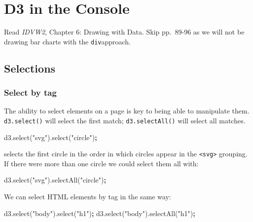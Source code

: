 \documentclass[openany]{book}
\newenvironment{Shaded}{\begin{snugshade}}{\end{snugshade}}
\newcommand{\AttributeTok}[1]{\textcolor[rgb]{0.77,0.63,0.00}{#1}}
\newcommand{\NormalTok}[1]{#1}
\newcommand{\OperatorTok}[1]{\textcolor[rgb]{0.81,0.36,0.00}{\textbf{#1}}}
\newcommand{\StringTok}[1]{\textcolor[rgb]{0.31,0.60,0.02}{#1}}
\newcommand{\VariableTok}[1]{\textcolor[rgb]{0.00,0.00,0.00}{#1}}
\begin{document}
\protect\hyperlink{web-tech-shapes}{}

\hypertarget{d3console}{%
\chapter{D3 in the Console }\label{d3console}}

Read \emph{IDVW2}, Chapter 6: Drawing with Data. Skip pp.~89-96 as we will not be drawing bar charts with the \texttt{div}approach.

\hypertarget{selections}{%
\section{Selections }\label{selections}}

\hypertarget{select-by-tag}{%
\subsection{Select by tag}\label{select-by-tag}}

The ability to select elements on a page is key to being able to manipulate them. \texttt{d3.select()} will select the first match; \texttt{d3.selectAll()} will select all matches.

\begin{Shaded}
\begin{Highlighting}[]
\VariableTok{d3}\NormalTok{.}\AttributeTok{select}\NormalTok{(}\StringTok{"svg"}\NormalTok{).}\AttributeTok{select}\NormalTok{(}\StringTok{"circle"}\NormalTok{)}\OperatorTok{;}
\end{Highlighting}
\end{Shaded}

selects the first circle in the order in which circles appear in the \texttt{\textless{}svg\textgreater{}} grouping. If there were more than one circle we could select them all with:

\begin{Shaded}
\begin{Highlighting}[]
\VariableTok{d3}\NormalTok{.}\AttributeTok{select}\NormalTok{(}\StringTok{"svg"}\NormalTok{).}\AttributeTok{selectAll}\NormalTok{(}\StringTok{"circle"}\NormalTok{)}\OperatorTok{;}
\end{Highlighting}
\end{Shaded}

We can select HTML elements by tag in the same way:

\begin{Shaded}
\begin{Highlighting}[]
\VariableTok{d3}\NormalTok{.}\AttributeTok{select}\NormalTok{(}\StringTok{"body"}\NormalTok{).}\AttributeTok{select}\NormalTok{(}\StringTok{"h1"}\NormalTok{)}\OperatorTok{;}
\VariableTok{d3}\NormalTok{.}\AttributeTok{select}\NormalTok{(}\StringTok{"body"}\NormalTok{).}\AttributeTok{selectAll}\NormalTok{(}\StringTok{"h1"}\NormalTok{)}\OperatorTok{;}
\end{Highlighting}
\end{Shaded}
\end{document}
